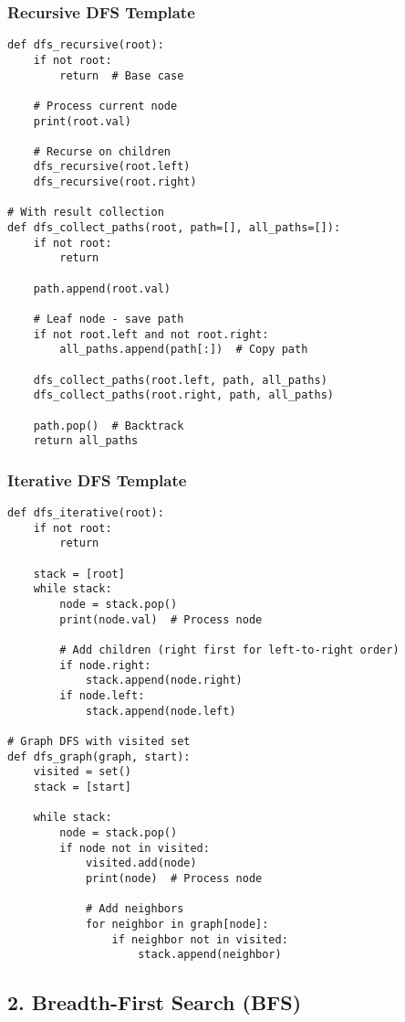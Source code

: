 \documentclass[10pt,a4paper]{article}
\begin{document}
\subsubsection{Recursive DFS Template}
\begin{lstlisting}
def dfs_recursive(root):
    if not root:
        return  # Base case

    # Process current node
    print(root.val)

    # Recurse on children
    dfs_recursive(root.left)
    dfs_recursive(root.right)

# With result collection
def dfs_collect_paths(root, path=[], all_paths=[]):
    if not root:
        return

    path.append(root.val)

    # Leaf node - save path
    if not root.left and not root.right:
        all_paths.append(path[:])  # Copy path

    dfs_collect_paths(root.left, path, all_paths)
    dfs_collect_paths(root.right, path, all_paths)

    path.pop()  # Backtrack
    return all_paths
\end{lstlisting}

\subsubsection{Iterative DFS Template}
\begin{lstlisting}
def dfs_iterative(root):
    if not root:
        return

    stack = [root]
    while stack:
        node = stack.pop()
        print(node.val)  # Process node

        # Add children (right first for left-to-right order)
        if node.right:
            stack.append(node.right)
        if node.left:
            stack.append(node.left)

# Graph DFS with visited set
def dfs_graph(graph, start):
    visited = set()
    stack = [start]

    while stack:
        node = stack.pop()
        if node not in visited:
            visited.add(node)
            print(node)  # Process node

            # Add neighbors
            for neighbor in graph[node]:
                if neighbor not in visited:
                    stack.append(neighbor)
\end{lstlisting}

\subsection{2. Breadth-First Search (BFS)}
\end{document}
